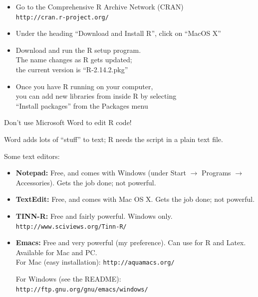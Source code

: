 \documentclass[pdflatex,landscape,titlepage]{foils}
\begin{document}
\bgclear

\begin{itemize}
\item Go to the Comprehensive R Archive Network (CRAN) \\
      \texttt{http://cran.r-project.org/}

\item Under the heading ``Download and Install R'', click on ``MacOS X''

\item Download and run the R setup program.  \\
The name changes as R gets updated; \\
the current version is ``R-2.14.2.pkg''

\item Once you have R running on your computer, \\
you can add new libraries from inside R by selecting \\
``Install packages'' from the Packages menu
\end{itemize}

\bgclear

Don't use Microsoft Word to edit R code!

Word adds lots of ``stuff'' to text; R needs the script in a plain text file.

Some text editors:

\begin{itemize}
\item \textbf{Notepad:}  Free, and comes with Windows (under Start
  $\rightarrow$ Programs $\rightarrow$ Accessories).  Gets the job
  done; not powerful.

\item \textbf{TextEdit:}  Free, and comes with Mac OS X.  Gets the job done;
  not powerful.

\item \textbf{TINN-R:}  Free and fairly powerful.  Windows only.\\
\texttt{http://www.sciviews.org/Tinn-R/}

\item \textbf{Emacs:} Free and very powerful (my preference).  Can use
  for R and Latex.  Available
  for Mac and PC.\\

For Mac (easy installation):  \texttt{http://aquamacs.org/}

For Windows (see the README):  \texttt{http://ftp.gnu.org/gnu/emacs/windows/}



\end{itemize}
\end{document}
